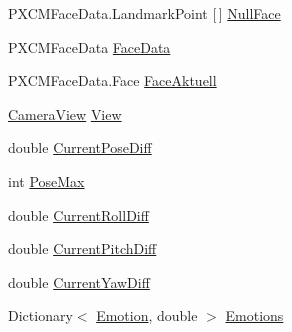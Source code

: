 \begin{DoxyCompactItemize}
\item 
P\+X\+C\+M\+Face\+Data.\+Landmark\+Point \mbox{[}$\,$\mbox{]} \hyperlink{class_real_sense_1_1_model_af626df64a18cb2fcf4cbc06ffbadfa17}{Null\+Face}
\item 
P\+X\+C\+M\+Face\+Data \hyperlink{class_real_sense_1_1_model_a0d16c2536a9f3c346cc3d51b3227989e}{Face\+Data}
\item 
P\+X\+C\+M\+Face\+Data.\+Face \hyperlink{class_real_sense_1_1_model_a3621c14d22c3709775971fed725c2781}{Face\+Aktuell}
\item 
\hyperlink{class_real_sense_1_1_camera_view}{Camera\+View} \hyperlink{class_real_sense_1_1_model_ad06548f5b1e3b3bfeaca2635d2b24fc6}{View}
\item 
double \hyperlink{class_real_sense_1_1_model_a7a0873ddece63f5d3eb49f087771e9c6}{Current\+Pose\+Diff}
\item 
int \hyperlink{class_real_sense_1_1_model_a556c083ee213249d05c2383ffc8e46f4}{Pose\+Max}
\item 
double \hyperlink{class_real_sense_1_1_model_a7ba288087bcec5d88a34064df08fbf20}{Current\+Roll\+Diff}
\item 
double \hyperlink{class_real_sense_1_1_model_a9701d5e1b5c733f70349f94ec7fee978}{Current\+Pitch\+Diff}
\item 
double \hyperlink{class_real_sense_1_1_model_ae5d9b51742c782f5f79c38761cfaee3c}{Current\+Yaw\+Diff}
\item 
Dictionary$<$ \hyperlink{class_real_sense_1_1_model_a5bf3fde8f53519f7a740d8b4e0399208}{Emotion}, double $>$ \hyperlink{class_real_sense_1_1_model_a30358a7ea8e1e59815e2f562a3fc6bad}{Emotions}
\item 

\end{DoxyCompactItemize}
